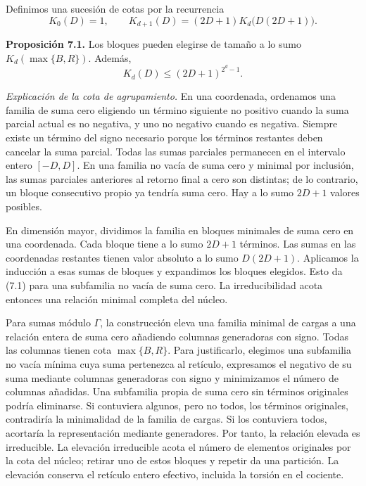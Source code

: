\documentclass[spanish,11pt,a4paper]{article}
\begin{document}
Definimos una sucesión de cotas por la recurrencia
\[K_0(D)=1,\qquad
K_{d+1}(D)=(2D+1)K_d\bigl(D(2D+1)\bigr).                           \tag{7.1}\]

\textbf{Proposición 7.1.} Los bloques pueden elegirse de tamaño a lo sumo \(K_d(\max\{B,R\})\). Además,
\[K_d(D)\leq(2D+1)^{2^d-1}.                                         \tag{7.2}\]

\emph{Explicación de la cota de agrupamiento.} En una coordenada, ordenamos una familia de suma cero eligiendo un término siguiente no positivo cuando la suma parcial actual es no negativa, y uno no negativo cuando es negativa. Siempre existe un término del signo necesario porque los términos restantes deben cancelar la suma parcial. Todas las sumas parciales permanecen en el intervalo entero \([-D,D]\). En una familia no vacía de suma cero y minimal por inclusión, las sumas parciales anteriores al retorno final a cero son distintas; de lo contrario, un bloque consecutivo propio ya tendría suma cero. Hay a lo sumo \(2D+1\) valores posibles.

En dimensión mayor, dividimos la familia en bloques minimales de suma cero en una coordenada. Cada bloque tiene a lo sumo \(2D+1\) términos. Las sumas en las coordenadas restantes tienen valor absoluto a lo sumo \(D(2D+1)\). Aplicamos la inducción a esas sumas de bloques y expandimos los bloques elegidos. Esto da (7.1) para una subfamilia no vacía de suma cero. La irreducibilidad acota entonces una relación minimal completa del núcleo.

Para sumas módulo \(\Gamma\), la construcción eleva una familia minimal de cargas a una relación entera de suma cero añadiendo columnas generadoras con signo. Todas las columnas tienen cota \(\max\{B,R\}\). Para justificarlo, elegimos una subfamilia no vacía mínima cuya suma pertenezca al retículo, expresamos el negativo de su suma mediante columnas generadoras con signo y minimizamos el número de columnas añadidas. Una subfamilia propia de suma cero sin términos originales podría eliminarse. Si contuviera algunos, pero no todos, los términos originales, contradiría la minimalidad de la familia de cargas. Si los contuviera todos, acortaría la representación mediante generadores. Por tanto, la relación elevada es irreducible. La elevación irreducible acota el número de elementos originales por la cota del núcleo; retirar uno de estos bloques y repetir da una partición. La elevación conserva el retículo entero efectivo, incluida la torsión en el cociente.
\end{document}

